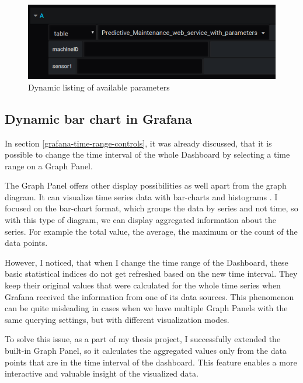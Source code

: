 \begin{figure}[h]
	\centering
	\includegraphics[width=130mm, keepaspectratio]{figures/dynamic-parameters.png}
	\caption{Dynamic listing of available parameters}
	\label{fig:dynamic-parameters}
\end{figure}

\subsection{Dynamic bar chart in Grafana} \label{dynamic-barchart}

In section \ref{grafana-time-range-controls}, it was already discussed, that it is possible to change the time interval of the whole Dashboard by selecting a time range on a Graph Panel.

The Graph Panel offers other display possibilities as well apart from the graph diagram. It can visualize time series data with bar-charts and histograms \cite{graph-panel}. I focused on the bar-chart format, which groups the data by series and not time, so with this type of diagram, we can display aggregated information about the series. For example the total value, the average, the maximum or the count of the data points.

However, I noticed, that when I change the time range of the Dashboard, these basic statistical indices do not get refreshed based on the new time interval. They keep their original values that were calculated for the whole time series when Grafana received the information from one of its data sources. This phenomenon can be quite misleading in cases when we have multiple Graph Panels with the same querying settings, but with different visualization modes.

To solve this issue, as a part of my thesis project, I successfully extended the built-in Graph Panel, so it calculates the aggregated values only from the data points that are in the time interval of the dashboard. This feature enables a more interactive and valuable insight of the visualized data.

